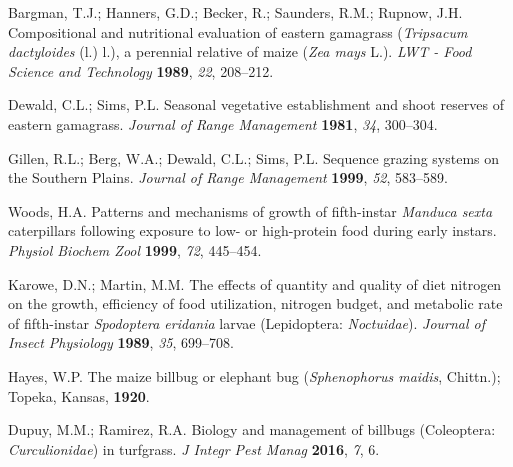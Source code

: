 \documentclass[agronomy,article,submit,moreauthors,pdftex,10pt,a4paper]{mdpi}
\theoremstyle{mdpi}
\newcounter{ex}
\newcounter{re}
\theoremstyle{mdpidefinition}
\begin{document}
\begin{thebibliography}{999}
Bargman, T.J.; Hanners, G.D.; Becker, R.; Saunders, R.M.; Rupnow, J.H. Compositional and nutritional evaluation of eastern gamagrass (\textit{Tripsacum dactyloides} (l.) l.), a perennial relative of maize (\textit{Zea mays }L.). \textit{LWT - Food Science and Technology }\textbf{1989}, \textit{22}, 208–212.

Dewald, C.L.; Sims, P.L. Seasonal vegetative establishment and shoot reserves of eastern gamagrass. \textit{Journal of Range Management} \textbf{1981}, \textit{34}, 300–304.

Gillen, R.L.; Berg, W.A.; Dewald, C.L.; Sims, P.L. Sequence grazing systems on the Southern Plains. \textit{Journal of Range Management }\textbf{1999}, \textit{52}, 583–589.

Woods, H.A. Patterns and mechanisms of growth of fifth-instar \textit{Manduca sexta} caterpillars following exposure to low- or high-protein food during early instars. \textit{Physiol Biochem Zool} \textbf{1999}, \textit{72}, 445–454.

Karowe, D.N.; Martin, M.M. The effects of quantity and quality of diet nitrogen on the growth, efficiency of food utilization, nitrogen budget, and metabolic rate of fifth-instar \textit{Spodoptera eridania} larvae (Lepidoptera: \textit{Noctuidae}). \textit{Journal of Insect Physiology }\textbf{1989}, \textit{35}, 699–708.

Hayes, W.P. The maize billbug or elephant bug (\textit{Sphenophorus maidis}, Chittn.); Topeka, Kansas, \textbf{1920}.

Dupuy, M.M.; Ramirez, R.A. Biology and management of billbugs (Coleoptera: \textit{Curculionidae}) in turfgrass. \textit{J Integr Pest Manag} \textbf{2016}, \textit{7}, 6.

\end{thebibliography}
\end{document}
